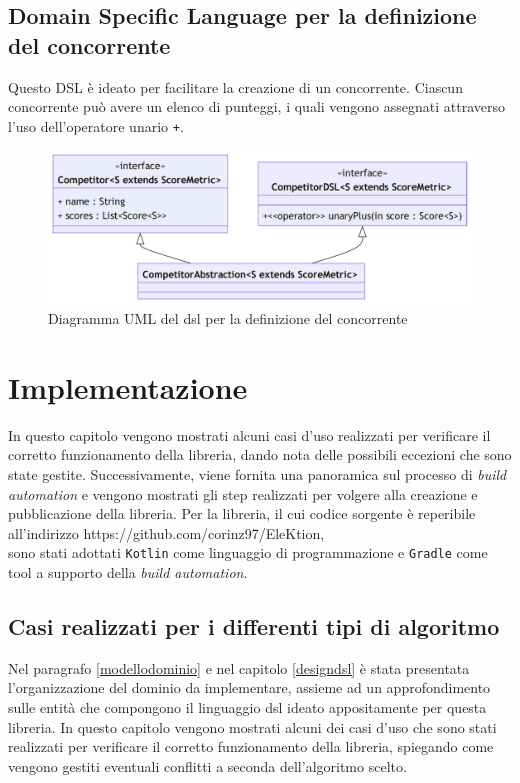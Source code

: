 \documentclass[12pt,a4paper,openright,twoside]{book}
\begin{document}
\section{Domain Specific Language per la definizione del concorrente}
Questo DSL è ideato per facilitare la creazione di un concorrente.
Ciascun concorrente può avere un elenco di punteggi, i quali vengono
assegnati attraverso l'uso dell'operatore unario \texttt{+}.
\begin{figure}[H]
    \centering
     \includegraphics[width=1.1\linewidth]{figures/competitorDSL.pdf}
     \caption{Diagramma UML del \ac{dsl} per la definizione del concorrente}
    \label{fig:competitorDSL}
 \end{figure}
 \newpage

\chapter{Implementazione}
In questo capitolo vengono mostrati alcuni casi d'uso realizzati per verificare il corretto funzionamento della libreria,
dando nota delle possibili eccezioni che sono state gestite.
Successivamente, viene fornita una panoramica sul processo di \textit{build automation} e
vengono mostrati gli step realizzati per volgere alla creazione e pubblicazione della libreria.
Per la libreria, il cui codice sorgente è reperibile all'indirizzo https://github.com/corinz97/EleKtion, \\
sono stati adottati \texttt{Kotlin} come linguaggio di programmazione
e \texttt{Gradle} come tool a supporto della \textit{build automation}.
\section{Casi realizzati per i differenti tipi di algoritmo}
Nel paragrafo \ref{modellodominio} e nel capitolo \ref{designdsl} è stata presentata l'organizzazione del dominio
da implementare, assieme ad un approfondimento sulle entità che compongono il linguaggio \ac{dsl}
ideato appositamente per questa libreria.
In questo capitolo vengono mostrati alcuni dei casi d'uso che sono stati realizzati per verificare il corretto funzionamento della libreria,
spiegando come vengono gestiti eventuali conflitti a seconda dell'algoritmo scelto.
\end{document}
